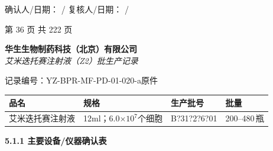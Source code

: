 \documentclass[UTF8,10pt,a4paper,fontset=fandol]{ctexart}
\renewcommand{\arraystretch}{1.15}
\newcommand{\fieldvalue}[1]{#1}
\newcommand{\handwritten}[1]{#1}
\begin{document}
\vspace{4mm}

\noindent
确认人/日期：
\fieldvalue{\handwritten{/}}%
\hfill
复核人/日期：
\fieldvalue{\handwritten{/}}

\vfill
\begin{center}
第 36 页 共 222 页
\end{center}


\newpage

\begin{center}
\textbf{华生生物制药科技（北京）有限公司}\\
\textit{艾米迭托赛注射液（Z2）批生产记录}
\end{center}

记录编号：YZ-BPR-MF-PD-01-020-a\hfill 原件

\renewcommand{\arraystretch}{1.35}
\small
\begin{tabularx}{\textwidth}{|>{\centering\arraybackslash}X|>{\centering\arraybackslash}X|>{\centering\arraybackslash}X|>{\centering\arraybackslash}X|}
\hline
品名 & 规格 & 生产批号 & 批量\\
\hline
\fieldvalue{艾米迭托赛注射液} &
\fieldvalue{12ml；6.0$\times 10^{7}$个细胞} &
\fieldvalue{\handwritten{B?31?2?6?01}} &
\fieldvalue{200--480\,瓶}\\
\hline
\end{tabularx}

\normalsize
\medskip
\textbf{5.1.1 主要设备/仪器确认表}
\end{document}
